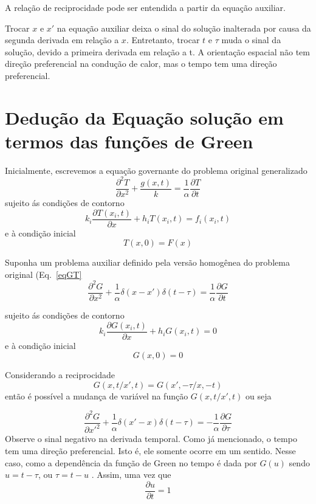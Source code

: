 A relação de reciprocidade pode ser entendida a partir da equação auxiliar. 

Trocar $x$ e $x'$ na equação auxiliar deixa o sinal do solução inalterada por causa da segunda derivada em relação a $x$. 
Entretanto, trocar $t$ e $\tau$ muda o sinal da solução, devido a primeira derivada em relação a t. A orientação espacial não tem direção preferencial na condução de calor, mas o tempo tem uma direção preferencial.
\section{Dedução da Equação solução em termos das funções de Green}
Inicialmente, escrevemos a equação governante do problema original generalizado
\begin{equation}\label{eqGT}
    \frac{\partial ^2T}{\partial x^2} + \frac{g(x,t)}{k} 
    = \frac{1}{\alpha} \frac{\partial T}{\partial t}  
\end{equation}
sujeito ás condições de contorno
\begin{equation}\label{ccemT}
    k_i \frac{\partial T(x_i,t)}{\partial x}  + h_i T(x_i,t) =  f_i(x_i,t)   
\end{equation}
e à condição inicial
\begin{equation}\label{iniT}
    T(x,0) = F(x)
\end{equation}
	
Suponha um problema auxiliar definido pela versão homogênea do problema original (Eq.~\ref{eqGT}
\begin{equation}\label{eqGG}
    \frac{\partial ^2G}{\partial x^2} + 
    \frac{1}{\alpha} \delta(x-x')\delta(t-\tau) = 
    \frac{1}{\alpha} \frac{\partial G}{\partial t}  
\end{equation}

sujeito ás condições de contorno
\begin{equation}\label{ccemG}
    k_i \frac{ \partial G(x_i,t)} {\partial x}  +h_i G(x_i,t) =  0   
\end{equation}
e à condição inicial	
\begin{equation}\label{iniG}
    G(x,0) = 0
\end{equation}
	
Considerando a reciprocidade
\begin{equation}\label{rec}
    G(x,t/x',t) =  G(x',-\tau/x, -t) 
\end{equation}
então é possível a mudança de variável na função $G(x,t/x',t)$ ou seja
	
\begin{equation}\label{eq1DGtau}
    \frac{\partial^2 G}{\partial x'^2} + 
    \frac{1}{\alpha} \delta(x'-x)\delta(t-\tau) = 
    -\frac{1}{\alpha} \frac{\partial G}{\partial \tau}  
\end{equation}
Observe o sinal negativo na derivada temporal. Como já mencionado, o tempo tem uma direção preferencial. Isto é, ele somente ocorre em um sentido. Nesse caso, como a dependência da  função de Green no tempo é dada por $G(u)$ sendo $u =  t - \tau$, ou $\tau = t - u$ . Assim, uma vez que
\begin{equation}\label{rec3}
    \frac{ \partial u}{\partial t} = 1
\end{equation}
	
